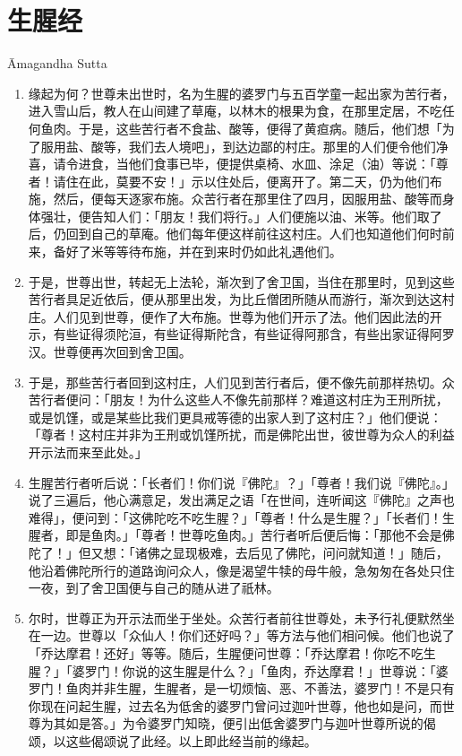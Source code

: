 \section{生腥经}

\begin{center}Āmagandha Sutta\end{center}\vspace{1em}

\begin{enumerate}\item 缘起为何？世尊未出世时，名为生腥的婆罗门与五百学童一起出家为苦行者，进入雪山后，教人在山间建了草庵，以林木的根果为食，在那里定居，不吃任何鱼肉。于是，这些苦行者不食盐、酸等，便得了黄疸病。随后，他们想「为了服用盐、酸等，我们去人境吧」，到达边鄙的村庄。那里的人们便令他们净喜，请令进食，当他们食事已毕，便提供桌椅、水皿、涂足（油）等说：「尊者！请住在此，莫要不安！」示以住处后，便离开了。第二天，仍为他们布施，然后，便每天逐家布施。众苦行者在那里住了四月，因服用盐、酸等而身体强壮，便告知人们：「朋友！我们将行。」人们便施以油、米等。他们取了后，仍回到自己的草庵。他们每年便这样前往这村庄。人们也知道他们何时前来，备好了米等等待布施，并在到来时仍如此礼遇他们。
\item 于是，世尊出世，转起无上法轮，渐次到了舍卫国，当住在那里时，见到这些苦行者具足近依后，便从那里出发，为比丘僧团所随从而游行，渐次到达这村庄。人们见到世尊，便作了大布施。世尊为他们开示了法。他们因此法的开示，有些证得须陀洹，有些证得斯陀含，有些证得阿那含，有些出家证得阿罗汉。世尊便再次回到舍卫国。
\item 于是，那些苦行者回到这村庄，人们见到苦行者后，便不像先前那样热切。众苦行者便问：「朋友！为什么这些人不像先前那样？难道这村庄为王刑所扰，或是饥馑，或是某些比我们更具戒等德的出家人到了这村庄？」他们便说：「尊者！这村庄并非为王刑或饥馑所扰，而是佛陀出世，彼世尊为众人的利益开示法而来至此处。」
\item 生腥苦行者听后说：「长者们！你们说『佛陀』？」「尊者！我们说『佛陀』。」说了三遍后，他心满意足，发出满足之语「在世间，连听闻这『佛陀』之声也难得」，便问到：「这佛陀吃不吃生腥？」「尊者！什么是生腥？」「长者们！生腥者，即是鱼肉。」「尊者！世尊吃鱼肉。」苦行者听后便后悔：「那他不会是佛陀了！」但又想：「诸佛之显现极难，去后见了佛陀，问问就知道！」随后，他沿着佛陀所行的道路询问众人，像是渴望牛犊的母牛般，急匆匆在各处只住一夜，到了舍卫国便与自己的随从进了祇林。
\item 尔时，世尊正为开示法而坐于坐处。众苦行者前往世尊处，未予行礼便默然坐在一边。世尊以「众仙人！你们还好吗？」等方法与他们相问候。他们也说了「乔达摩君！还好」等等。随后，生腥便问世尊：「乔达摩君！你吃不吃生腥？」「婆罗门！你说的这生腥是什么？」「鱼肉，乔达摩君！」世尊说：「婆罗门！鱼肉并非生腥，生腥者，是一切烦恼、恶、不善法，婆罗门！不是只有你现在问起生腥，过去名为低舍的婆罗门曾问过迦叶世尊，他也如是问，而世尊为其如是答。」为令婆罗门知晓，便引出低舍婆罗门与迦叶世尊所说的偈颂，以这些偈颂说了此经。以上即此经当前的缘起。

\end{enumerate}
